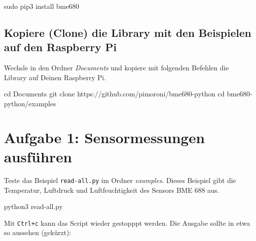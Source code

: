 \documentclass[
  11pt,
  a4paper,
  oneside, openany  ,captions=tableheading
]{scrbook}
\newenvironment{Shaded}{\begin{snugshade}}{\end{snugshade}}
\newcommand{\BuiltInTok}[1]{\textcolor[rgb]{0.00,0.23,0.31}{#1}}
\newcommand{\ExtensionTok}[1]{\textcolor[rgb]{0.00,0.23,0.31}{#1}}
\newcommand{\FunctionTok}[1]{\textcolor[rgb]{0.28,0.35,0.67}{#1}}
\newcommand{\NormalTok}[1]{\textcolor[rgb]{0.00,0.23,0.31}{#1}}
\theoremstyle{remark}
\renewcommand{\markright}[1]{\def\chaptertitle{#1}} %
\begin{document}
\begin{Shaded}
\begin{Highlighting}[]
\FunctionTok{sudo}\NormalTok{ pip3 install bme680}
\end{Highlighting}
\end{Shaded}

\subsection*{Kopiere (Clone) die Library mit den Beispielen auf den
Raspberry
Pi}\label{kopiere-clone-die-library-mit-den-beispielen-auf-den-raspberry-pi}

Wechsle in den Ordner \emph{Documents} und kopiere mit folgenden
Befehlen die Library auf Deinen Raspberry Pi.

\begin{Shaded}
\begin{Highlighting}[]
\BuiltInTok{cd}\NormalTok{ Documents}
\FunctionTok{git}\NormalTok{ clone https://github.com/pimoroni/bme680{-}python }
\BuiltInTok{cd}\NormalTok{ bme680{-}python/examples}
\end{Highlighting}
\end{Shaded}

\section*{Aufgabe 1: Sensormessungen
ausführen}\label{aufgabe-1-sensormessungen-ausfuxfchren}

\markright{Aufgabe 1: Sensormessungen ausführen}

Teste das Beispiel \texttt{read-all.py} im Ordner \emph{examples}.
Dieses Beispiel gibt die Temperatur, Luftdruck und Luftfeuchtigkeit des
Sensors BME 688 aus.

\begin{Shaded}
\begin{Highlighting}[]
\ExtensionTok{python3}\NormalTok{ read{-}all.py}
\end{Highlighting}
\end{Shaded}

Mit \texttt{Ctrl+c} kann das Script wieder gestopppt werden. Die Ausgabe
sollte in etwa so aussehen (gekürzt):
\end{document}

